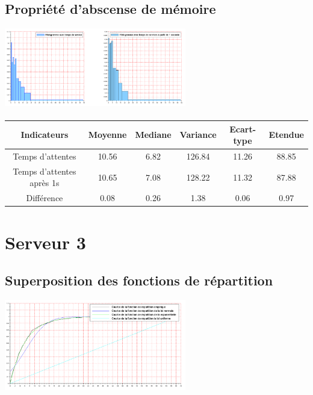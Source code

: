 \documentclass{article}
\begin{document}
\paragraph{}

\subsection{Propriété d'abscense de mémoire}
\begin{center}
\includegraphics[width=300px]{img/S2_mem.png}
\end{center}
\paragraph{}

\begin{center}
\begin{tabular}{|c|c|c|c|c|c|}
  \hline
  Indicateurs & Moyenne & Mediane & Variance & Ecart-type & Etendue \\
  \hline
  Temps d'attentes & 10.56 & 6.82 & 126.84 & 11.26 & 88.85 \\
  Temps d'attentes après 1s & 10.65 & 7.08 & 128.22 & 11.32 & 87.88 \\
  Différence & 0.08 & 0.26 & 1.38 & 0.06 & 0.97 \\
  \hline
\end{tabular}
\end{center}

\section{Serveur 3}

\subsection{Superposition des fonctions de répartition}
\begin{center}
\includegraphics[width=300px]{img/S3_repartitions.png}
\end{center}
\end{document}
